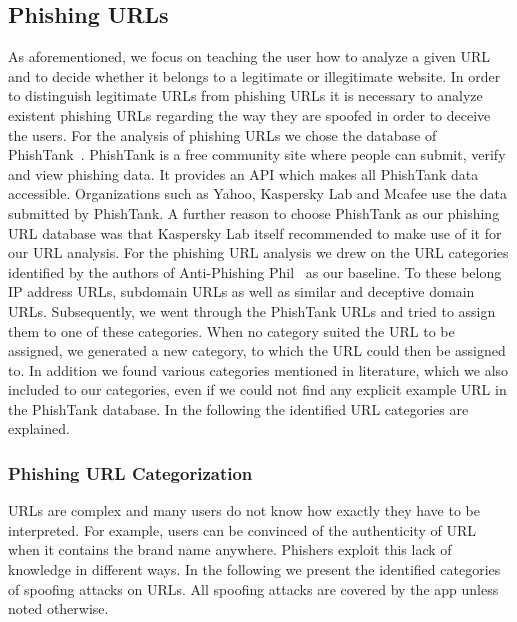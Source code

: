 \subsection{Phishing URLs}
As aforementioned, we focus on teaching the user how to analyze a given URL and to decide whether it belongs to a legitimate or illegitimate website.
 In order to distinguish legitimate URLs from phishing URLs it is necessary to analyze existent phishing URLs regarding the way they are spoofed in order to deceive the users.
 For the analysis of phishing URLs we chose the database of PhishTank~\cite{phishtank}.
PhishTank is a free community site where people can submit, verify and view phishing data.
 It provides an API which makes all PhishTank data accessible.
 Organizations such as Yahoo, Kaspersky Lab and Mcafee use the data submitted by PhishTank. A further reason to choose PhishTank as our phishing URL database was that Kaspersky Lab itself recommended to make use of it for our URL analysis.
 For the phishing URL analysis we drew on the URL categories identified by the authors of Anti-Phishing Phil~\cite{sheng2007antiphishingphil} as our baseline.
 To these belong IP address URLs, subdomain URLs as well as similar and deceptive domain URLs.
 Subsequently, we went through the PhishTank URLs and tried to assign them to one of these categories.
 When no category suited the URL to be assigned, we generated a new category, to which the URL could then be assigned to.
 In addition we found various categories mentioned in literature, which we also included to our categories, even if we could not find any explicit example URL in the PhishTank database.
 In the following the identified URL categories are explained.
\subsubsection{Phishing URL Categorization}
\label{s:url_categories}
URLs are complex and many users do not know how exactly they have to be interpreted.
 For example, users can be convinced of the authenticity of URL when it contains the brand name anywhere.
 Phishers exploit this lack of knowledge in different ways.
 In the following we present the identified categories of spoofing attacks on URLs. 
 All spoofing attacks are covered by the app unless noted otherwise.

